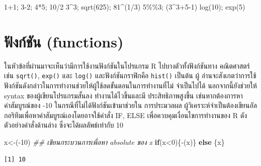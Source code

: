 \documentclass[
  a4paper,
]{book}
\newenvironment{Shaded}{\begin{snugshade}}{\end{snugshade}}
\newcommand{\ControlFlowTok}[1]{\textcolor[rgb]{0.00,0.23,0.31}{\textbf{#1}}}
\newcommand{\DecValTok}[1]{\textcolor[rgb]{0.68,0.00,0.00}{#1}}
\newcommand{\DocumentationTok}[1]{\textcolor[rgb]{0.37,0.37,0.37}{\textit{#1}}}
\newcommand{\FunctionTok}[1]{\textcolor[rgb]{0.28,0.35,0.67}{#1}}
\newcommand{\NormalTok}[1]{\textcolor[rgb]{0.00,0.23,0.31}{#1}}
\newcommand{\OtherTok}[1]{\textcolor[rgb]{0.00,0.23,0.31}{#1}}
\newcommand{\SpecialCharTok}[1]{\textcolor[rgb]{0.37,0.37,0.37}{#1}}
\begin{document}
\begin{Shaded}
\begin{Highlighting}[]
\DecValTok{1}\SpecialCharTok{+}\DecValTok{1}\NormalTok{; }\DecValTok{3{-}2}\NormalTok{; }\DecValTok{4}\SpecialCharTok{*}\DecValTok{5}\NormalTok{; }\DecValTok{10}\SpecialCharTok{/}\DecValTok{2}
\DecValTok{3}\SpecialCharTok{\^{}}\DecValTok{3}\NormalTok{; }\FunctionTok{sqrt}\NormalTok{(}\DecValTok{625}\NormalTok{); }\DecValTok{81}\SpecialCharTok{\^{}}\NormalTok{(}\DecValTok{1}\SpecialCharTok{/}\DecValTok{3}\NormalTok{)}
\DecValTok{5}\SpecialCharTok{\%\%}\DecValTok{3}\NormalTok{; (}\DecValTok{3}\SpecialCharTok{\^{}}\DecValTok{3}\SpecialCharTok{+}\DecValTok{5{-}1}\NormalTok{)}
\FunctionTok{log}\NormalTok{(}\DecValTok{10}\NormalTok{); }\FunctionTok{exp}\NormalTok{(}\DecValTok{5}\NormalTok{)}
\end{Highlighting}
\end{Shaded}

\section{ฟังก์ชัน (functions)}\label{uxe1fuxe07uxe01uxe0auxe19-functions}

ในหัวข้อที่ผ่านมาจะเห็นว่ามีการใช้งานฟังก์ชันในโปรแกรม R ไปบางตัวทั้งฟังก์ชันทาง คณิตศาสตร์
เช่น \texttt{sqrt()}, \texttt{exp()} และ \texttt{log()} และฟังก์ชันกราฟิกคือ
\texttt{hist()} เป็นต้น ผู้
อ่านจะสังเกตว่าการใช้ฟังก์ชันดังกล่าวในการทำงานช่วยให้ผู้ใช้ลดขั้นตอนในการทำงานที่ไม่
จำเป็นไปได้ นอกจากนี้ยังช่วยให้ syntax ของผู้เขียนโปรแกรมสั้นลง ทำงานได้ไวขึ้นและมี
ประสิทธิภาพสูงขึ้น เช่นหากต้องการหาค่าสัมบูรณ์ของ -10 ในกรณีที่ไม่ได้ฟังก์ชันเข้ามาช่วยใน
การประมวลผล ผู้วิเคราะห์จำเป็นต้องเขียนอัลกอริทึมเพื่อหาค่าสัมบูรณ์เองโดยอาจใช้คำสั่ง IF,
ELSE เพื่อควบคุมเงื่อนไขการทำงานของ R ดังตัวอย่างคำสั่งด้านล่าง ซึ่งจะได้ผลลัพธ์เท่ากับ 10

\begin{Shaded}
\begin{Highlighting}[]
\NormalTok{x}\OtherTok{\textless{}{-}}\NormalTok{(}\SpecialCharTok{{-}}\DecValTok{10}\NormalTok{)}
\DocumentationTok{\#\# เขียนกระบวนการเพื่อหา absolute ของ x}
\ControlFlowTok{if}\NormalTok{(x}\SpecialCharTok{\textless{}}\DecValTok{0}\NormalTok{)\{}\SpecialCharTok{{-}}\NormalTok{(x)\} }\ControlFlowTok{else}\NormalTok{ \{x\}}
\end{Highlighting}
\end{Shaded}

\begin{verbatim}
[1] 10
\end{verbatim}
\end{document}
